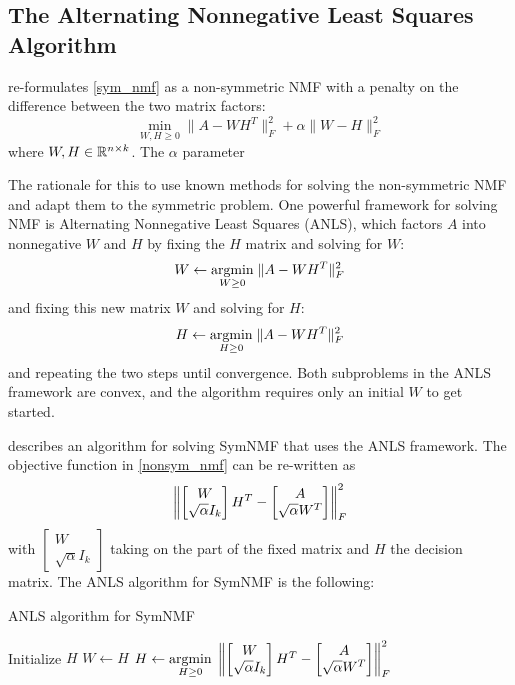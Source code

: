 \subsection{The Alternating Nonnegative Least Squares Algorithm}

\cite{Kuang:15} re-formulates \ref{sym_nmf} as a non-symmetric NMF
with a penalty on the difference between the two matrix factors:
\begin{equation} \label{nonsym_nmf}
\min_{W,H \geq 0} \|A - W H^T\|_F^2 + \alpha \|W - H\|_F^2
\end{equation}
where $W,H \in \mathbb{R}^{n \times k}$. The $\alpha$ parameter 

The rationale for this to use known methods for solving the
non-symmetric NMF and adapt them to the symmetric problem.
One powerful framework for solving NMF is Alternating Nonnegative
Least Squares (ANLS), which factors $A$ into nonnegative $W$ and $H$
by fixing the $H$ matrix and solving for $W$:
$$ W \gets \underset{W \geq 0}{\mathrm{arg min}}\; \|A - W H^T\|_F^2 $$
and fixing this new matrix $W$ and solving for $H$:
$$ H \gets \underset{H \geq 0}{\mathrm{arg min}}\; \|A - W H^T\|_F^2 $$
and repeating the two steps until convergence.
Both subproblems in the ANLS framework are convex, and the algorithm
requires only an initial $W$ to get started.

\cite{Kuang:15} describes an algorithm for solving SymNMF that uses
the ANLS framework. The objective function in \ref{nonsym_nmf} can be
re-written as
\begin{equation} \label{nls}
\left\lVert \begin{bmatrix} W \\ \sqrt{\alpha} I_k \end{bmatrix} H^T
     - \begin{bmatrix} A \\ \sqrt{\alpha} W^T \end{bmatrix} \right\rVert_F^2
\end{equation}
with $\begin{bmatrix} W \\ \sqrt{\alpha} I_k \end{bmatrix}$ taking on
the part of the fixed matrix and $H$ the decision matrix. The ANLS
algorithm for SymNMF is the following:

\begin{algorithm}
\caption{ANLS algorithm for SymNMF}
\begin{algorithmic}[1]
\State Initialize $H$
\Repeat
  \State $W \gets H$
  \State $H \gets \underset{H \geq 0}{\mathrm{arg min}}\;
    \left\lVert \begin{bmatrix} W \\ \sqrt{\alpha} I_k \end{bmatrix} H^T
         - \begin{bmatrix} A \\ \sqrt{\alpha} W^T \end{bmatrix} \right\rVert_F^2$
\end{algorithmic}  
\end{algorithm}

